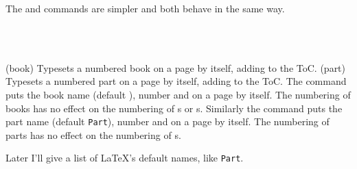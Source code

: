     The \cmd{\book} and \cmd{\part} commands are simpler and both behave
in the same way.
\begin{syntax}
\cmd{\book} \\
\cmd{\part} \\
\end{syntax}
\glossary(book)%
  {}%
  {Typesets a numbered book  on a page by itself, adding
    to the ToC.}
\glossary(part)%
  {}%
  {Typesets a numbered part  on a page by itself, adding
    to the ToC.}
The \cmd{\book} command puts the book name (default
\texttt{\bookname}), number and  on a page by itself. The
numbering of books has no effect on the numbering of
\cmd{\part}s or \cmd{\chapter}s.
Similarly the \cmd{\part} command puts the part name
(default \texttt{Part}), number and  on a page by itself.
The numbering of parts has no effect on the numbering of
\cmd{\chapter}s.

    Later I'll give a list of LaTeX's default names, like \texttt{Part}.

